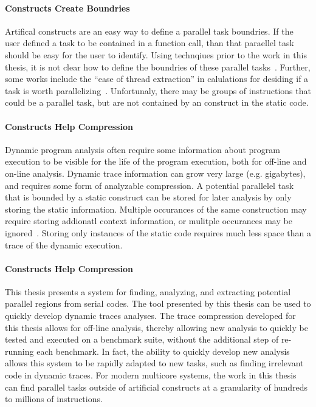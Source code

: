 \documentclass[defaultstyle,11pt]{thesis}
\begin{document}
\noindent\paragraph{Constructs Create Boundries}

Artifical constructs are an easy way to define a parallel task
boundries.  If the user defined a task to be contained in a function
call, than that paraellel task should be easy for the user to
identify.  Using technqiues prior to the work in this thesis, it is
not clear how to define the boundries of these parallel
tasks~\cite{jeon:2011:hotpar, garcia:2011:pldi}.  Further, some works
include the ``ease of thread extraction'' in calulations for desiding
if a task is worth parallelizing~\cite{garcia:2011:pldi}.
Unfortunaly, there may be groups of instructions that could be a
parallel task, but are not contained by an construct in the static
code.

\noindent\paragraph{Constructs Help Compression}

Dynamic program analysis often require some information about program
execution to be visible for the life of the program execution, both
for off-line and on-line analysis.  Dynamic trace information can grow
very large (e.g. gigabytes), and requires some form of analyzable
compression.  A potential parallelel task that is bounded by a static
construct can be stored for later analysis by only storing the static
information. Multiple occurances of the same construction may require
storing addionatl context information, or mulitple occurances may be
ignored~\cite{minjang:10:micro, jeon:2011:hotpar, garcia:2011:pldi}.
Storing only instances of the static code requires much less space
than a trace of the dynamic execution.

\noindent\paragraph{Constructs Help Compression}

This thesis presents a system for finding, analyzing, and extracting
potential parallel regions from serial codes.  The tool presented by
this thesis can be used to quickly develop dynamic traces analyses.
The trace compression developed for this thesis allows for off-line
analysis, thereby allowing new analysis to quickly be tested and
executed on a benchmark suite, without the additional step of
re-running each benchmark.  In fact, the ability to quickly develop new
analysis allows this system to be rapidly adapted to new tasks, such
as finding irrelevant code in dynamic traces.  For modern multicore
systems, the work in this thesis can find parallel tasks outside of
artificial constructs at a granularity of hundreds to millions of
instructions.
\end{document}
